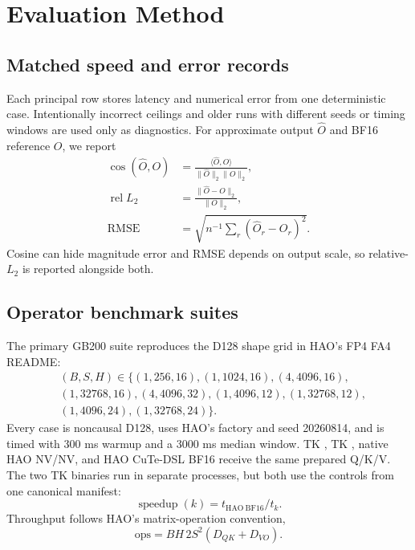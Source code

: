 \section{Evaluation Method}

\subsection{Matched speed and error records}

Each principal row stores latency and numerical error from one deterministic
case. Intentionally incorrect ceilings and older runs with different seeds or
timing windows are used only as diagnostics. For approximate output
$\widehat O$ and BF16 reference $O$, we report
\begin{align}
  \operatorname{cos}(\widehat O,O)
    &=\frac{\langle\widehat O,O\rangle}
      {\lVert\widehat O\rVert_2\lVert O\rVert_2}, \\
  \operatorname{rel}L_2
    &=\frac{\lVert\widehat O-O\rVert_2}{\lVert O\rVert_2}, \\
  \operatorname{RMSE}
    &=\sqrt{n^{-1}\sum_r(\widehat O_r-O_r)^2}.
\end{align}
Cosine can hide magnitude error and RMSE depends on output scale, so
relative-$L_2$ is reported alongside both.

\subsection{Operator benchmark suites}

The primary GB200 suite reproduces the D128 shape grid in HAO's FP4 FA4
README:
\begin{equation}
\begin{split}
 &(B,S,H)\in\{(1,256,16),(1,1024,16),
 (4,4096,16),\\
 &(1,32768,16),(4,4096,32),(1,4096,12),
 (1,32768,12),\\
 &(1,4096,24),(1,32768,24)\}.
\end{split}
\label{eq:hao-grid}
\end{equation}
Every case is noncausal D128, uses HAO's
 factory and seed 20260814, and is
timed with 300 ms warmup and a 3000 ms median window. TK , TK
, native HAO NV/NV, and HAO CuTe-DSL BF16 receive the same
prepared Q/K/V. The two TK binaries run in separate processes, but both use
the controls from one canonical manifest:
\begin{equation}
  \operatorname{speedup}(k)=t_{\mathrm{HAO\ BF16}}/t_k.
  \label{eq:canonical-speedup}
\end{equation}
Throughput follows HAO's matrix-operation convention,
\begin{equation}
  \mathrm{ops}=BH\,2S^2(D_{QK}+D_{VO}).
  \label{eq:hao-flops}
\end{equation}

